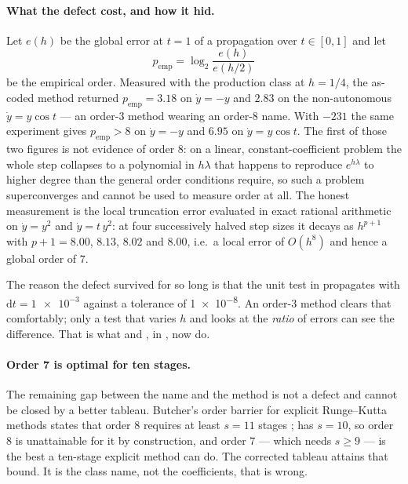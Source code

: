 \paragraph{What the defect cost, and how it hid.}
Let $e(h)$ be the global error at $t = 1$ of a propagation over $t\in[0,1]$
and let
\begin{equation}
  \label{eq:int-emporder}
  p_{\mathrm{emp}} = \log_2 \frac{e(h)}{e(h/2)}
\end{equation}
be the empirical order. Measured with the production  class at
$h = 1/4$, the as-coded method returned $p_{\mathrm{emp}} = 3.18$ on
$\dot y = -y$ and $2.83$ on the non-autonomous $\dot y = y\cos t$ --- an
order-$3$ method wearing an order-$8$ name. With $-231$ the same experiment
gives $p_{\mathrm{emp}} > 8$ on $\dot y = -y$ and $6.95$ on
$\dot y = y\cos t$. The first of those two figures is not evidence of order
$8$: on a linear, constant-coefficient problem the whole step collapses to a
polynomial in $h\lambda$ that happens to reproduce $e^{h\lambda}$ to higher
degree than the general order conditions require, so such a problem
superconverges and cannot be used to measure order at all. The honest
measurement is the local truncation error evaluated in exact rational
arithmetic on $\dot y = y^{2}$ and $\dot y = t\,y^{2}$: at four successively
halved step sizes it decays as $h^{p+1}$ with $p+1 = 8.00$, $8.13$, $8.02$
and $8.00$, i.e.\ a local error of $O(h^{8})$ and hence a global order of
$7$.

The reason the defect survived for so long is that the unit test in
 propagates with
$\mathrm{d}t = \num{1e-3}$ against a tolerance of \num{1e-8}. An order-$3$
method clears that comfortably; only a test that varies $h$ and looks at the
\emph{ratio} of errors can see the difference. That is what
 and
, in
, now do.

\paragraph{Order 7 is optimal for ten stages.}
The remaining gap between the name and the method is not a defect and cannot
be closed by a better tableau. Butcher's order barrier for explicit
Runge--Kutta methods states that order $8$ requires at least $s = 11$ stages
\citep[Thm.~II.5.1]{hairer1993};  has $s = 10$, so order $8$ is
unattainable for it by construction, and order $7$ --- which needs $s \ge 9$
--- is the best a ten-stage explicit method can do. The corrected tableau
attains that bound. It is the class name, not the coefficients, that is
wrong.

